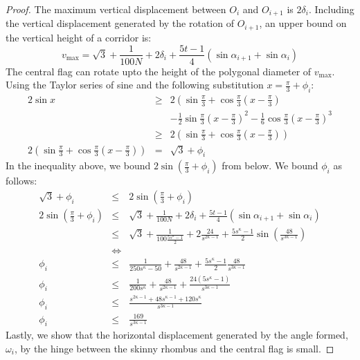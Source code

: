 \documentclass[10pt]{CSUNthesis}
\theoremstyle{plain}%
\theoremstyle{definition}
\theoremstyle{remark}
\newcommand{\lr}[1]{\left( #1 \right)}
\begin{document}
\begin{proof}
The maximum vertical displacement between $O_i$ and $O_{i+1}$ is $2 \delta_i$.  
Including the vertical displacement generated by the rotation of $O_{i+1}$, an upper bound on the vertical height of a corridor is:
$$v_\text{max}=\sqrt{3} + \frac{1}{100N} + 2 \delta_i + \frac{5t-1}{4}  \lr{ \sin \alpha_{i+1} +  \sin \alpha_{i} }$$
The central flag can rotate upto the height of the polygonal diameter of $v_\text{max}$.  
Using the Taylor series of sine and the following substitution $x = \frac{\pi}{3} + \phi_i$:
\begin{eqnarray*}
2 \sin x &\geq&  2 \left( \sin \frac{\pi}{3} + \cos \frac{\pi}{3} \lr{x - \frac{\pi}{3}}\right.\\
&& \left.- \frac{1}{2} \sin \frac{\pi}{3} \lr{x - \frac{\pi}{3}}^2 - \frac{1}{6} \cos \frac{\pi}{3} \lr{x - \frac{\pi}{3}}^3\right. \\
&\geq&2 \lr{ \sin \frac{\pi}{3} + \cos \frac{\pi}{3} \lr{x - \frac{\pi}{3}}}\\
2 \lr{ \sin \frac{\pi}{3} + \cos \frac{\pi}{3} \lr{x - \frac{\pi}{3}}} &=& \sqrt{3} + \phi_i 
\end{eqnarray*}
In the inequality above, we bound $2 \sin  \lr{\frac{\pi}{3} + \phi_i}$ from below. 
We bound $\phi_i$ as follows: 
\begin{eqnarray*}
\sqrt{3} + \phi_i  &\leq & 2\sin \lr{ \frac{\pi}{3} + \phi_i }\\
2\sin \lr{ \frac{\pi}{3} + \phi_i } &\leq&\sqrt{3} + \frac{1}{100N} + 2 \delta_i + \frac{5t-1}{4}  \lr{ \sin \alpha_{i+1} +  \sin \alpha_{i} }\\
&\leq& \sqrt{3} + \frac{1}{100 \frac{5s^\kappa - 1}{2}} + 2 \frac{24}{s^{2\kappa-1}} + \frac{5s^\kappa-1}{2}  \sin \lr{\frac{48}{s^{3\kappa-1}}}\\
&\iff&\\
\phi_i &\leq&  \frac{1}{250s^\kappa - 50} +  \frac{48}{s^{2\kappa-1}} + \frac{5s^\kappa-1}{2} \frac{48}{s^{3\kappa-1}} \\
\phi_i &\leq& \frac{1}{200 s^\kappa} + \frac{48}{s^{2\kappa-1}} + \frac{24\lr{5s^\kappa - 1}}{s^{3\kappa-1}}\\
\phi_i &\leq& \frac{s^{2\kappa - 1} + 48s^{\kappa - 1}+ 120 s^\kappa}{s^{3\kappa-1}}\\
\phi_i &\leq& \frac{169}{s^{3\kappa - 1}}
\end{eqnarray*}
Lastly, we show that the horizontal displacement generated by the angle formed, $\omega_i$, by the hinge between the skinny rhombus and the central flag is small.

\end{proof}
\end{document}

